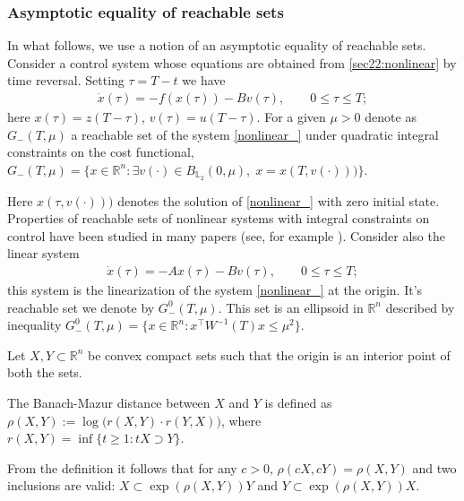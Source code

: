\documentclass[../main.tex]{subfiles}
\begin{document}
\subsubsection{Asymptotic equality of reachable sets}

In what follows, we use a notion of an asymptotic equality of reachable sets. Consider a control system whose equations are obtained from \eqref{sec22:nonlinear} by time reversal. Setting $\tau=T-t$ we have
\begin{gather}\label{nonlinear_}
			\dot{x}(\tau)=-f(x(\tau))-B v(\tau),\qquad 0 \leqslant \tau \leqslant T; 
\end{gather}
here $x(\tau)=z(T-\tau)$, $v(\tau)=u(T-\tau)$.
For a given $\mu>0$ denote as $ G_{-} (T,\mu)$ a reachable set of the system \eqref{nonlinear_} under quadratic integral constraints on the cost functional, $G_{-}(T,\mu)=\{x\in \mathbb{R}^n:\exists v(\cdot)\in B_{\mathbb{L}_2}(0,\mu),\; x=x( T,v(\cdot)))\}$.
		 
Here $x( \tau,v(\cdot)))$ denotes the solution of \eqref{nonlinear_} with zero initial state. Properties of reachable sets of nonlinear systems with integral constraints on control have been studied in many papers (see, for example \cite{Guseinov,Rousse,GusZykIFAC}).
Consider also the linear system 
\begin{gather}\label{linear_}
			\dot{x}(\tau)=-Ax(\tau)-B v(\tau),\qquad 0 \leqslant \tau \leqslant T; 
\end{gather}
this system is the linearization of  the system \eqref{nonlinear_} at the origin. It's reachable set we denote by $G_{-}^0(T,\mu)$. This set is an ellipsoid in $\mathbb{R}^n$ described by inequality $G_{-}^0(T,\mu)=\{x \in \mathbb{R}^n: x^\top W^{-1}(T)x\leqslant \mu^2\} $.			

Let $X,Y \subset \mathbb R^n $ be convex compact sets such that the origin is an interior point of both the sets.
\begin{definition}
The Banach-Mazur distance between $X$ and $Y$  is defined as
$\rho(X,Y):=\log\big(r(X,Y)\cdot r(Y,X)\big)$, where \\ $r(X,Y)=\inf \{t\geqslant1:tX \supset Y\}$. 
\end{definition} 
From the definition it follows that for any $c>0$, $\rho(cX,cY)=\rho(X,Y)$ and two inclusions are valid: $X\subset \exp(\rho(X,Y))Y$ and $Y\subset \exp(\rho(X,Y))X$.
\end{document}
